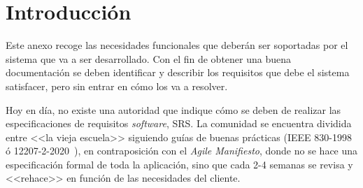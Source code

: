 
\section{Introducción}
Este anexo recoge las necesidades funcionales que deberán ser soportadas por el sistema que va a ser desarrollado. Con el fin de obtener una buena documentación se deben identificar y describir los requisitos que debe el sistema satisfacer, pero sin entrar en cómo los va a resolver.

Hoy en día, no existe una autoridad que indique cómo se deben de realizar las especificaciones de requisitos \textit{software}, SRS. La comunidad se encuentra dividida entre <<la vieja escuela>> siguiendo guías de buenas prácticas (IEEE 830-1998~\cite{720574} ó 12207-2-2020~\cite{IEEE1220722020}), en contraposición con el \textit{Agile Manifiesto}, donde no se hace una especificación formal de toda la aplicación, sino que cada 2-4 semanas se revisa y <<rehace>> en función de las necesidades del cliente.

